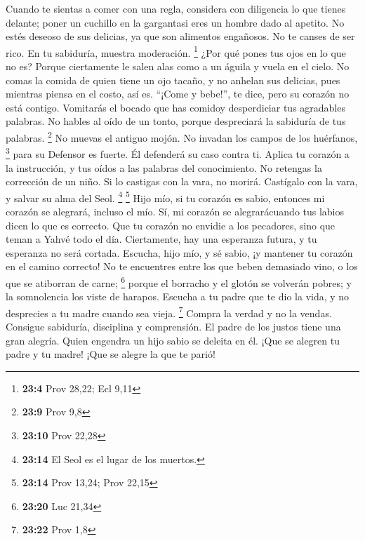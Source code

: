 \begin{paracol}{2}
 Cuando te sientas a comer con una regla, considera con
diligencia lo que tienes delante;  poner un cuchillo en la
gargantasi eres un hombre dado al apetito.  No estés
deseoso de sus delicias, ya que son alimentos engañosos. 
No te canses de ser rico. En tu sabiduría, muestra moderación.
\footnote{\textbf{23:4} Prov 28,22; Ecl 9,11}  ¿Por qué
pones tus ojos en lo que no es? Porque ciertamente le salen alas como a
un águila y vuela en el cielo.  No comas la comida de
quien tiene un ojo tacaño, y no anhelan sus delicias, 
pues mientras piensa en el costo, así es. ``¡Come y bebe!'', te dice,
pero su corazón no está contigo.  Vomitarás el bocado que
has comidoy desperdiciar tus agradables palabras.  No
hables al oído de un tonto, porque despreciará la sabiduría de tus
palabras. \footnote{\textbf{23:9} Prov 9,8}  No muevas el
antiguo mojón. No invadan los campos de los huérfanos, \footnote{\textbf{23:10}
  Prov 22,28}  para su Defensor es fuerte. Él defenderá
su caso contra ti.  Aplica tu corazón a la instrucción, y
tus oídos a las palabras del conocimiento.  No retengas
la corrección de un niño. Si lo castigas con la vara, no morirá.
 Castígalo con la vara, y salvar su alma del Seol.
\footnote{\textbf{23:14} El Seol es el lugar de los muertos.}
\footnote{\textbf{23:14} Prov 13,24; Prov 22,15}  Hijo
mío, si tu corazón es sabio, entonces mi corazón se alegrará, incluso el
mío.  Sí, mi corazón se alegrarácuando tus labios dicen
lo que es correcto.  Que tu corazón no envidie a los
pecadores, sino que teman a Yahvé todo el día. 
Ciertamente, hay una esperanza futura, y tu esperanza no será cortada.
 Escucha, hijo mío, y sé sabio, ¡y mantener tu corazón en
el camino correcto!  No te encuentres entre los que beben
demasiado vino, o los que se atiborran de carne; \footnote{\textbf{23:20}
  Luc 21,34}  porque el borracho y el glotón se volverán
pobres; y la somnolencia los viste de harapos.  Escucha a
tu padre que te dio la vida, y no desprecies a tu madre cuando sea
vieja. \footnote{\textbf{23:22} Prov 1,8}  Compra la
verdad y no la vendas. Consigue sabiduría, disciplina y comprensión.
 El padre de los justos tiene una gran alegría. Quien
engendra un hijo sabio se deleita en él.  ¡Que se alegren
tu padre y tu madre! ¡Que se alegre la que te parió! 

\end{paracol}
